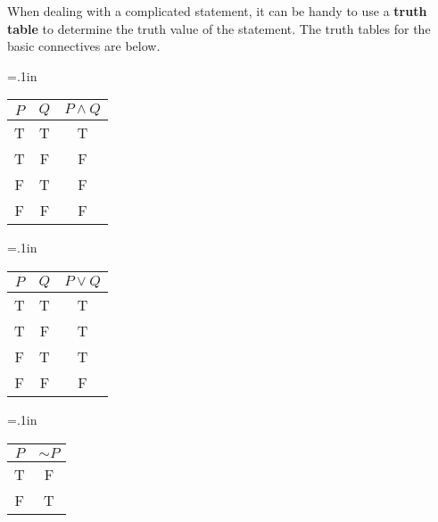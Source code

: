 \documentclass[12 pt]{article}
\theoremstyle{definition}
\theoremstyle{plain}
\theoremstyle{mytheorem}
\theoremstyle{myexample}
\theoremstyle{mydefinition}
\begin{document}
\noindent When dealing with a complicated statement, it can be handy to use a \textbf{truth table} to determine the truth value of the statement.  The truth tables for the basic connectives are below.
\begin{multicols}{3}
{\tabulinesep=.1in
\begin{tabu}{|cc|c|}
\hline
$P$ & $Q$ & $P \wedge Q$ \\
\hline
T & T & T \\
T & F & F \\
F & T & F \\
F & F & F \\
\hline
\end{tabu}}

{\tabulinesep=.1in
\begin{tabu}{|cc|c|}
\hline
$P$ & $Q$ & $P \vee Q$ \\
\hline
T & T & T \\
T & F & T \\
F & T & T \\
F & F & F \\
\hline
\end{tabu}}

{\tabulinesep=.1in
\begin{tabu}{|c|c|}
\hline
$P$ & $\sim P$ \\
\hline
T & F \\
F & T \\
\hline
\end{tabu}}
\end{multicols}

\vspace{.5in}
\end{document}
